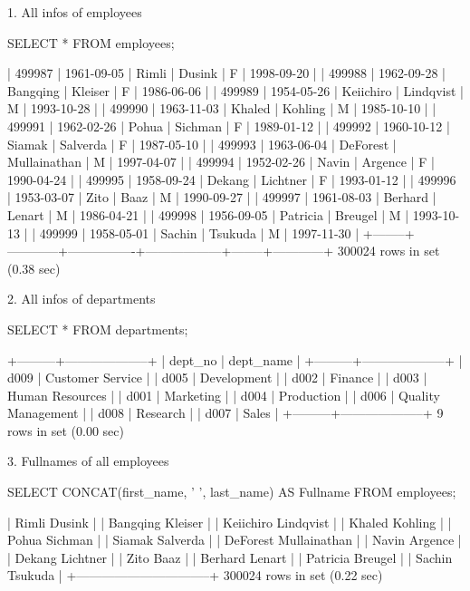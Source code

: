 1. All infos of employees

SELECT * FROM employees;

| 499987 | 1961-09-05 | Rimli          | Dusink           | F      | 1998-09-20 |
| 499988 | 1962-09-28 | Bangqing       | Kleiser          | F      | 1986-06-06 |
| 499989 | 1954-05-26 | Keiichiro      | Lindqvist        | M      | 1993-10-28 |
| 499990 | 1963-11-03 | Khaled         | Kohling          | M      | 1985-10-10 |
| 499991 | 1962-02-26 | Pohua          | Sichman          | F      | 1989-01-12 |
| 499992 | 1960-10-12 | Siamak         | Salverda         | F      | 1987-05-10 |
| 499993 | 1963-06-04 | DeForest       | Mullainathan     | M      | 1997-04-07 |
| 499994 | 1952-02-26 | Navin          | Argence          | F      | 1990-04-24 |
| 499995 | 1958-09-24 | Dekang         | Lichtner         | F      | 1993-01-12 |
| 499996 | 1953-03-07 | Zito           | Baaz             | M      | 1990-09-27 |
| 499997 | 1961-08-03 | Berhard        | Lenart           | M      | 1986-04-21 |
| 499998 | 1956-09-05 | Patricia       | Breugel          | M      | 1993-10-13 |
| 499999 | 1958-05-01 | Sachin         | Tsukuda          | M      | 1997-11-30 |
+--------+------------+----------------+------------------+--------+------------+
300024 rows in set (0.38 sec)

2. All infos of departments

SELECT * FROM departments;

+---------+--------------------+
| dept_no | dept_name          |
+---------+--------------------+
| d009    | Customer Service   |
| d005    | Development        |
| d002    | Finance            |
| d003    | Human Resources    |
| d001    | Marketing          |
| d004    | Production         |
| d006    | Quality Management |
| d008    | Research           |
| d007    | Sales              |
+---------+--------------------+
9 rows in set (0.00 sec)

3. Fullnames of all employees

SELECT CONCAT(first_name, ' ', last_name) AS Fullname FROM employees;

| Rimli Dusink                   |
| Bangqing Kleiser               |
| Keiichiro Lindqvist            |
| Khaled Kohling                 |
| Pohua Sichman                  |
| Siamak Salverda                |
| DeForest Mullainathan          |
| Navin Argence                  |
| Dekang Lichtner                |
| Zito Baaz                      |
| Berhard Lenart                 |
| Patricia Breugel               |
| Sachin Tsukuda                 |
+--------------------------------+
300024 rows in set (0.22 sec)

